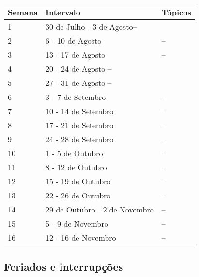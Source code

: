 \begin{table}[H]
	\centering
	\begin{tabular}{lll}%
	\toprule
	\textbf{Semana} & \textbf{Intervalo} & \textbf{Tópicos} \\ 
	\midrule
	1	&	30 de Julho - 3 de Agosto--\\
	2	&	6 - 10 de Agosto	&	--\\%
    3 	&	13 - 17 de Agosto	&	--\\%
    4	&	20 - 24 de Agosto --\\%
    5	&	27 - 31 de Agosto --\\%
    6	&	3 - 7 de Setembro	& 	--\\%
    7	&	10 - 14 de Setembro	&	--\\%
    8	&	17 - 21 de Setembro	&	--\\%
    9	&	24 - 28 de Setembro &	--\\%
    10	&	1 - 5 de Outubro	& 	--\\%
    11	&	8 - 12 de Outubro	&	--\\%
    12	&	15 - 19 de Outubro	& 	--\\%
    13	&	22 - 26 de Outubro 	&	--\\%
    14	&	29 de Outubro - 2 de Novembro	&	--\\%
    15	&	5 - 9 de Novembro	& 	--\\%
    16  &	12 - 16 de Novembro	&	--\\
     \bottomrule
 	 \end{tabular}
 	 \centering
\end{table}

\subsection*{Feriados e interrupções}

